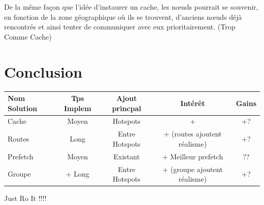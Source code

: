 \documentclass[11pt,a4paper]{article}
\begin{document}
\par De la même façon que l'idée d'instaurer un cache, les nœuds pourrait se souvenir, en fonction de la zone géographique où ils se trouvent, d'anciens nœuds déjà rencontrés et ainsi tenter de communiquer avec eux prioritairement. (Trop Comme Cache)

\section{Conclusion}

\vspace{1cm}
\begin{tabular}{|l|c|c|c|c|}
\hline
Nom Solution & Tps Implem & Ajout princpal & Intérêt & Gains \\
\hline
Cache & Moyen & Hotspots & + & +? \\
Routes & Long & Entre Hotspots & + (routes ajoutent réalisme) & +?\\
Prefetch & Moyen & Existant & + Meilleur prefetch & ??\\
Groupe & + Long & Entre Hotspots & + (groupe ajoutent réalisme) & +?\\
\hline
\end{tabular}
\vspace{1cm}

\par Just Ro It !!!!



\newpage




 
\end{document}
